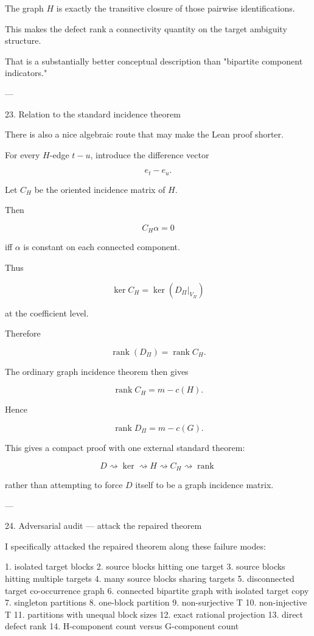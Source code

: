 The graph \(H\) is exactly the transitive closure of those pairwise identifications.

This makes the defect rank a connectivity quantity on the target ambiguity structure.

That is a substantially better conceptual description than "bipartite component indicators."


---

23. Relation to the standard incidence theorem

There is also a nice algebraic route that may make the Lean proof shorter.

For every \(H\)-edge \(t-u\), introduce the difference vector

\[
e_t-e_u.
\]

Let \(C_H\) be the oriented incidence matrix of \(H\).

Then

\[
C_H\alpha=0
\]

iff \(\alpha\) is constant on each connected component.

Thus

\[
\ker C_H=\ker(D_\Pi|_{V_\Pi})
\]

at the coefficient level.

Therefore

\[
\operatorname{rank}(D_\Pi)
=
\operatorname{rank}C_H.
\]

The ordinary graph incidence theorem then gives

\[
\operatorname{rank}C_H
=
m-c(H).
\]

Hence

\[
\operatorname{rank}D_\Pi
=
m-c(G).
\]

This gives a compact proof with one external standard theorem:

\[
\boxed{
D
\rightsquigarrow
\ker
\rightsquigarrow
H
\rightsquigarrow
C_H
\rightsquigarrow
\operatorname{rank}
}
\]

rather than attempting to force \(D\) itself to be a graph incidence matrix.


---

24. Adversarial audit — attack the repaired theorem

I specifically attacked the repaired theorem along these failure modes:

1. isolated target blocks
2. source blocks hitting one target
3. source blocks hitting multiple targets
4. many source blocks sharing targets
5. disconnected target co-occurrence graph
6. connected bipartite graph with isolated target copy
7. singleton partitions
8. one-block partition
9. non-surjective T
10. non-injective T
11. partitions with unequal block sizes
12. exact rational projection
13. direct defect rank
14. H-component count versus G-component count

